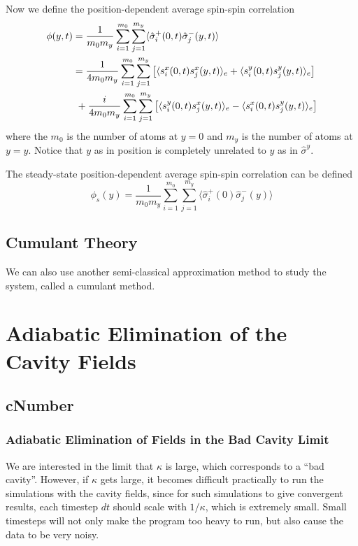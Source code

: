\documentclass{article}
\begin{document}
\begin{enumerate}
    Now we define the position-dependent average spin-spin correlation
    \begin{align}
        \phi(y,t) &= \frac{1}{m_{0}m_{y}}\sum_{i=1}^{m_0}\sum_{j=1}^{m_y}\langle \hat{\sigma}_i^+(0,t)\hat{\sigma}_j^-(y,t)\rangle\\
        \notag          &=\frac{1}{4m_{0}m_{y}}\sum_{i=1}^{m_0}\sum_{j=1}^{m_y}\left[\langle s_i^x(0,t) s_j^x(y,t)\rangle_e+\langle s_i^y(0,t) s_j^y(y,t)\rangle_e \right]\\
        \notag          &\ +\frac{i}{4m_{0}m_{y}}\sum_{i=1}^{m_0}\sum_{j=1}^{m_y}\left[\langle s_i^y(0,t)s_j^x(y,t)\rangle_e-\langle s_i^x(0,t)s_j^y(y,t)\rangle_e \right]
    \end{align}
    where the $m_0$ is the number of atoms at $y=0$ and $m_y$ is the number of atoms at $y=y$. Notice that $y$ as in position is completely unrelated to $y$ as in $\hat{\sigma}^y$.
    
    The steady-state position-dependent average spin-spin correlation can be defined
    \begin{equation}
        \phi_s(y) = \frac{1}{m_{0}m_{y}}\sum_{i=1}^{m_0}\sum_{j=1}^{m_y}\langle \hat{\sigma}_i^+(0)\hat{\sigma}_j^-(y)\rangle
    \end{equation}
\end{enumerate}



\subsection{Cumulant Theory}
\label{section: cumulant}
We can also use another semi-classical approximation method to study the system, called a cumulant method.


\section{Adiabatic Elimination of the Cavity Fields}
\subsection{cNumber}
\subsubsection{Adiabatic Elimination of Fields in the Bad Cavity Limit}
We are interested in the limit that $\kappa$ is large, which corresponds to a ``bad cavity''. However, if $\kappa$ gets large, it becomes difficult practically to run the simulations with the cavity fields, since for such simulations to give convergent results, each timestep $dt$ should scale with $1/\kappa$, which is extremely small. Small timesteps will not only make the program too heavy to run, but also cause the data to be very noisy. 
\end{document}

